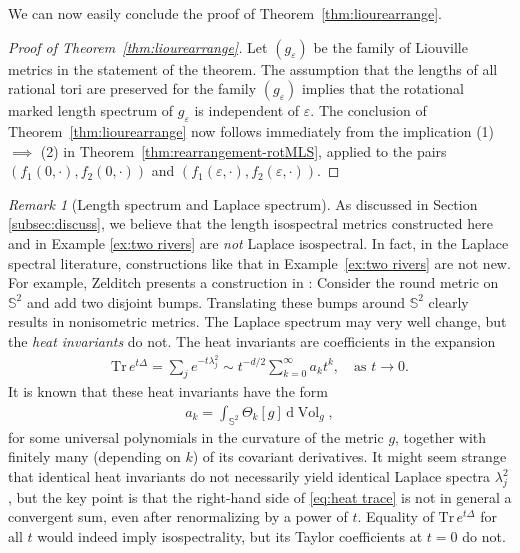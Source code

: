 \documentclass[11pt,letterpaper,oneside]{amsart}
\theoremstyle{definition}
\theoremstyle{remark}
\newcommand{\eps}{\varepsilon}
\newcommand{\tr}{\text{Tr}\,}
\newcommand{\vol}{{\operatorname{Vol}}}
\theoremstyle{definition}
\theoremstyle{remark}
\newtheorem*{remark}{Remark}
\newcommand{\dif}{\mathrm{d}}
\begin{document}
We can now easily conclude the proof of Theorem~\ref{thm:liourearrange}. 

\begin{proof}[Proof of Theorem~\ref{thm:liourearrange}]
    Let $(g_\eps)$ be the family of Liouville metrics in the statement of the theorem. 
The assumption that the lengths of all rational tori are preserved for the family $(g_\eps)$ implies that the rotational marked length spectrum of $g_\eps$ is independent of $\eps$. The conclusion of Theorem~\ref{thm:liourearrange} now follows immediately from the implication (1) $\implies$ (2) in Theorem~\ref{thm:rearrangement-rotMLS}, applied to the pairs $(f_1(0, \cdot), f_2(0, \cdot))$ and $(f_1(\eps, \cdot), f_2(\eps, \cdot))$.
\end{proof}

\begin{remark}[Length spectrum and Laplace spectrum] 
As discussed in Section \ref{subsec:discuss}, we believe that the length isospectral metrics constructed here and in Example \ref{ex:two rivers} are \emph{not} Laplace isospectral.
    In fact, in the Laplace spectral literature, constructions like that in Example~\ref{ex:two rivers} are not new. For example, Zelditch presents a construction in \cite{Zelditch3}: Consider the round metric on $\mathbb{S}^2$ and add two disjoint bumps. Translating these bumps around $\mathbb{S}^2$ clearly results in nonisometric metrics. The Laplace spectrum may very well change, but the \textit{heat invariants} do not. The heat invariants are coefficients in the expansion
\begin{align}\label{eq:heat trace}
    \tr e^{t \Delta} = \sum_j e^{- t \lambda_j^2} \sim t^{-d/2} \sum_{k = 0}^\infty a_k t^{k}, \quad \text{as}\,\, t \to 0.
\end{align}
It is known that these heat invariants have the form
\begin{align}
    a_k = \int_{\mathbb{S}^2} \Theta_k[g] \,\dif  \vol_g,
\end{align}
for some universal polynomials in the curvature of the metric $g$, together with finitely many (depending on $k$) of its covariant derivatives. It might seem strange that identical heat invariants do not necessarily yield identical Laplace spectra $\lambda_j^2$, but the key point is that the right-hand side of \eqref{eq:heat trace} is not in general a convergent sum, even after renormalizing by a power of $t$. Equality of $\tr e^{t \Delta}$ for all $t$ would indeed imply isospectrality, but its Taylor coefficients at $t = 0$ do not.

\end{remark}
\end{document}
